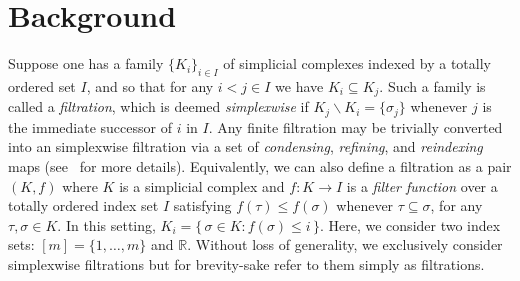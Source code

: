 \documentclass[sn-mathphys]{sn-jnl}
\begin{document}
\section{Background}\label{sec:background} 
Suppose one has a family $\{K_i\}_{i\in I}$ of simplicial complexes indexed by a totally ordered   set $I$, and so that for any $i< j \in I$ we have $K_i \subseteq K_j$. 
Such a family is called a \emph{filtration},
which is deemed \emph{simplexwise} if $K_j \smallsetminus K_i = \{\sigma_j\}$ 
whenever $j$ is the immediate successor of $i$ in $I$.
Any finite filtration may be trivially converted into an simplexwise filtration via a set of \emph{condensing}, \emph{refining}, and \emph{reindexing} maps (see~\cite{bauer2021ripser} for more details). 
Equivalently, we can also define a filtration as a pair $(K, f)$ where $K$ is a simplicial complex and $f : K \to I$ is a \emph{filter function} over a totally ordered index set $I$ satisfying $f(\tau) \leq f(\sigma)$ whenever $\tau \subseteq \sigma$, for any $\tau,\sigma \in K$. In this setting, $K_i = \{ \, \sigma \in K :  f(\sigma) \leq i \, \}$. Here, we consider two index sets: $[m] = \{ 1, \dots, m\}$ and $\mathbb{R}$. 
Without loss of generality, we exclusively consider simplexwise filtrations but for brevity-sake refer to them simply as filtrations. 
\end{document}

